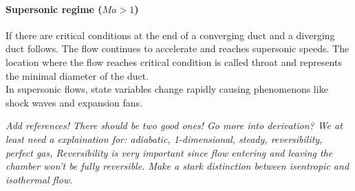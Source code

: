 \paragraph{Supersonic regime (\(Ma > 1\))} 

	If there are critical conditions at the end of a converging duct and a diverging duct follows.
	The flow continues to accelerate and reaches supersonic speeds.
	The location where the flow reaches critical condition is called throat and represents the minimal diameter of the duct.\\
	In supersonic flows, state variables change rapidly causing phenomenons like shock waves and expansion fans.
	
	

{\color{greenColor}\itshape
	Add references! There should be two good ones!
	Go more into derivation? We at least need a explaination for: adiabatic, 1-dimensional, steady, reversibility, perfect gas, 
	Reversibility is very important since flow entering and leaving the chamber won't be fully reversible.
	Make a stark distinction between isentropic and isothermal flow.
}
